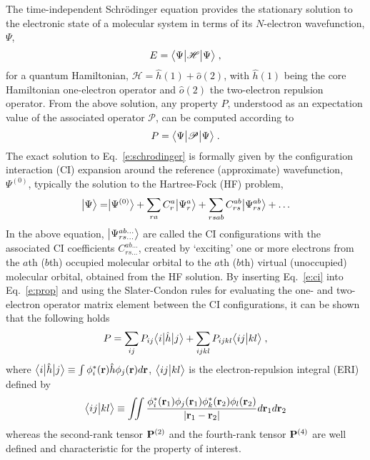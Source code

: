 The time\hyp{}independent Schr{\"o}dinger equation provides the stationary solution to the
electronic state
of a molecular system in terms of its $N$\hyp{}electron wavefunction, $\Psi$,
%
\begin{equation} \label{e:schrodinger}
 E = \tBraKet{\Psi}{\mathscr{H}}{\Psi} \;,
\end{equation}
%
for a quantum Hamiltonian, $\mathscr{H} = \hat{h}(1) + \hat{o}(2)$,
with $\hat{h}(1)$ being the core Hamiltonian one\hyp{}electron operator
and $\hat{o}(2)$ the two\hyp{}electron repulsion operator.
From the above solution, any property $P$, understood as an expectation value of the
associated operator $\mathscr{P}$, can be computed according to
%
\begin{equation} \label{e:prop}
 P = \tBraKet{\Psi}{\mathscr{P}}{\Psi} \;.
\end{equation}
%
The exact solution to Eq.~\eqref{e:schrodinger} is formally given by
the configuration interaction (CI) expansion around the reference 
(approximate) wavefunction, $\Psi^{(0)}$,
typically the solution to the Hartree\hyp{}Fock (HF) problem,
%
\begin{equation} \label{e:ci}
 \Ket{\Psi} = \Ket{\Psi^{(0)}} + \sum_{ra} C_{r}^{a} \Ket{\Psi_{r}^{a}} + 
	 \sum_{rsab} C_{rs}^{ab} \Ket{\Psi_{rs}^{ab}} + \ldots
\end{equation}
%
In the above equation,
$\Ket{\Psi_{rs\ldots}^{ab\ldots}}$ are called the CI configurations
with the associated CI coefficients $C_{rs\ldots}^{ab\ldots}$, created by `exciting'
one or more electrons from the $a$th ($b$th) occupied molecular orbital to the $a$th ($b$th)
virtual (unoccupied) molecular orbital, obtained from the HF solution.
By inserting Eq.~\eqref{e:ci} into Eq.~\eqref{e:prop} 
and using the Slater\hyp{}Condon rules for evaluating the one\hyp{} and two\hyp{}electron
operator matrix element between
the CI configurations, it can be shown that the following holds
%
\begin{equation} \label{e:exp-val-series}
	P =
	\sum_{ij} P_{ij} \tBraKet{i}{\hat{h}}{j}
	+ \sum_{ijkl} P_{ijkl} \BraKet{ij}{kl}  \;,
\end{equation}
%
where $\tBraKet{i}{\hat{h}}{j} \equiv \int \phi^*_i({\bf r}) \hat{h} \phi_j({\bf r}) d{\bf r} $,
$\BraKet{ij}{kl}$ is the electron\hyp{}repulsion integral (ERI) defined by
%
\begin{equation}
	\BraKet{ij}{kl} \equiv
	\iint 
	\frac{ \phi_i^{*}({\bf r}_1) \phi_j({\bf r}_1) 
	       \phi_k^{*}({\bf r}_2) \phi_l({\bf r}_2) }{ \vert {\bf r}_1 - {\bf r}_2 \vert}
	d{\bf r}_1 d{\bf r}_2
\end{equation}
%
whereas the second\hyp{}rank tensor ${\bf P}^{(2)}$ 
and the fourth\hyp{}rank tensor ${\bf P}^{(4)}$ 
are well defined and characteristic for the property of interest.

